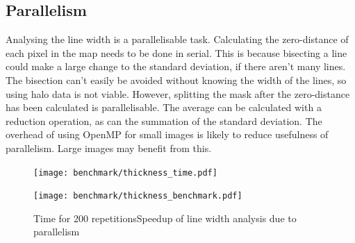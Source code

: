 \documentclass[../main.tex]{subfiles}
\begin{document}
  \subsection{Parallelism}
    Analysing the line width is a parallelisable task.
    Calculating the zero-distance of each pixel in the map needs to be done in serial.
    This is because bisecting a line could make a large change to the standard deviation, if there aren't many lines.
    The bisection can't easily be avoided without knowing the width of the lines, so using halo data is not viable.
    However, splitting the mask after the zero-distance has been calculated is parallelisable.
    The average can be calculated with a reduction operation, as can the summation of the standard deviation.
    The overhead of using OpenMP for small images is likely to reduce usefulness of parallelism.
    Large images may benefit from this.

    \begin{figure}[h]
      \centering
      \texttt{[image: benchmark/thickness\_time.pdf]}

      \texttt{[image: benchmark/thickness\_benchmark.pdf]}

      \caption[
        Time and Speedup of parallel line width analysis
      ]{Time for 200 repetitionsSpeedup of line width analysis due to parallelism}
      \label{thicknessbenchmark}
    \end{figure}
    \biblio
\end{document}
